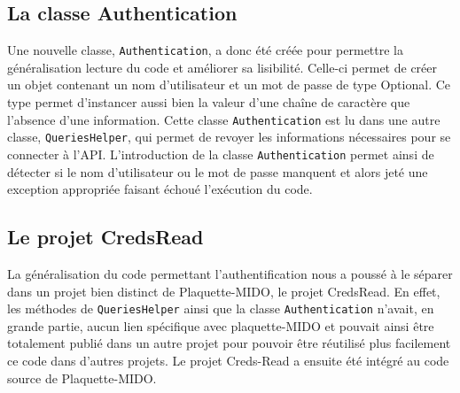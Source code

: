 \subsection{La classe Authentication}

Une nouvelle classe, \texttt{Authentication}, a donc été créée pour permettre la généralisation lecture du code et améliorer sa lisibilité. Celle-ci permet de créer un objet contenant un nom d'utilisateur et un mot de passe de type Optional. Ce type permet d'instancer aussi bien la valeur d'une chaîne de caractère que l'absence d'une information. Cette classe \texttt{Authentication} est lu dans une autre classe, \texttt{QueriesHelper}, qui permet de revoyer les informations nécessaires pour se connecter à l'API. L'introduction de la classe \texttt{Authentication} permet ainsi de détecter si le nom d'utilisateur ou le mot de passe manquent et alors jeté une exception appropriée faisant échoué l'exécution du code. 

\subsection{Le projet CredsRead}
La généralisation du code permettant l'authentification nous a poussé à le séparer dans un projet bien distinct de Plaquette-MIDO, le projet CredsRead. En effet, les méthodes de \texttt{QueriesHelper} ainsi que la classe \texttt{Authentication} n'avait, en grande partie, aucun lien spécifique avec plaquette-MIDO et pouvait ainsi être totalement publié dans un autre projet pour pouvoir être réutilisé plus facilement ce code dans d'autres projets. Le projet Creds-Read a ensuite été intégré au code source de Plaquette-MIDO.